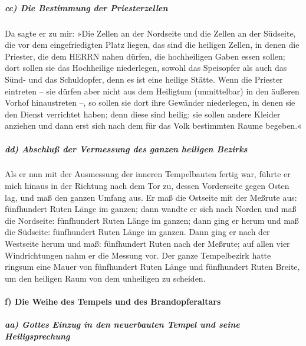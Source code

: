 \hypertarget{cc-die-bestimmung-der-priesterzellen}{%
\subparagraph{cc) Die Bestimmung der
Priesterzellen}\label{cc-die-bestimmung-der-priesterzellen}}

Da sagte er zu mir: »Die Zellen an der Nordseite und die
Zellen an der Südseite, die vor dem eingefriedigten Platz liegen, das
sind die heiligen Zellen, in denen die Priester, die dem HERRN nahen
dürfen, die hochheiligen Gaben essen sollen; dort sollen sie das
Hochheilige niederlegen, sowohl das Speisopfer als auch das Sünd- und
das Schuldopfer, denn es ist eine heilige Stätte. Wenn
die Priester eintreten -- sie dürfen aber nicht aus dem Heiligtum
(unmittelbar) in den äußeren Vorhof hinaustreten --, so sollen sie dort
ihre Gewänder niederlegen, in denen sie den Dienst verrichtet haben;
denn diese sind heilig: sie sollen andere Kleider anziehen und dann erst
sich nach dem für das Volk bestimmten Raume begeben.«

\hypertarget{dd-abschluuxdf-der-vermessung-des-ganzen-heiligen-bezirks}{%
\subparagraph{dd) Abschluß der Vermessung des ganzen heiligen
Bezirks}\label{dd-abschluuxdf-der-vermessung-des-ganzen-heiligen-bezirks}}

Als er nun mit der Ausmessung der inneren Tempelbauten
fertig war, führte er mich hinaus in der Richtung nach dem Tor zu,
dessen Vorderseite gegen Osten lag, und maß den ganzen Umfang aus.
Er maß die Ostseite mit der Meßrute aus: fünfhundert
Ruten Länge im ganzen; dann wandte er sich nach Norden
und maß die Nordseite: fünfhundert Ruten Länge im ganzen; dann ging er
herum und maß die Südseite: fünfhundert Ruten Länge im
ganzen. Dann ging er nach der Westseite herum und maß:
fünfhundert Ruten nach der Meßrute; auf allen vier
Windrichtungen nahm er die Messung vor. Der ganze Tempelbezirk hatte
ringsum eine Mauer von fünfhundert Ruten Länge und fünfhundert Ruten
Breite, um den heiligen Raum von dem unheiligen zu scheiden.

\hypertarget{f-die-weihe-des-tempels-und-des-brandopferaltars}{%
\paragraph{f) Die Weihe des Tempels und des
Brandopferaltars}\label{f-die-weihe-des-tempels-und-des-brandopferaltars}}

\hypertarget{aa-gottes-einzug-in-den-neuerbauten-tempel-und-seine-heiligsprechung}{%
\subparagraph{aa) Gottes Einzug in den neuerbauten Tempel und seine
Heiligsprechung}\label{aa-gottes-einzug-in-den-neuerbauten-tempel-und-seine-heiligsprechung}}

